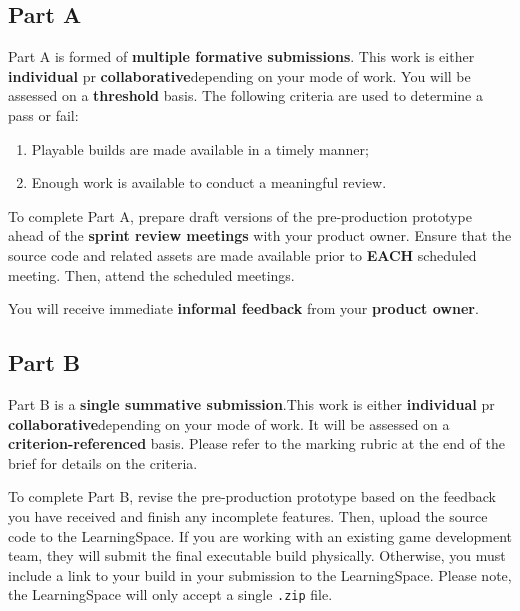 \documentclass{../../fal_assignment}
\begin{document}

\subsection*{Part A}

Part A is formed of \textbf{multiple formative submissions}. This work is either \textbf{individual} pr \textbf{collaborative}depending on your mode of work. You will be assessed on a \textbf{threshold} basis. The following criteria are used to determine a pass or fail:

\begin{enumerate}[label=(\alph*)]
	\item Playable builds are made available in a timely manner;
	\item Enough work is available to conduct a meaningful review.
\end{enumerate}

To complete Part A, prepare draft versions of the pre-production prototype ahead of the \textbf{sprint review meetings} with your product owner. Ensure that the source code and related assets are made available prior to \textbf{EACH} scheduled meeting. Then, attend the scheduled meetings.

You will receive immediate \textbf{informal feedback} from your \textbf{product owner}.

\subsection*{Part B}

Part B is a \textbf{single summative submission}.This work is either \textbf{individual} pr \textbf{collaborative}depending on your mode of work. It will be assessed on a \textbf{criterion-referenced} basis. Please refer to the marking rubric at the end of the brief for details on the criteria.

To complete Part B, revise the pre-production prototype based on the feedback you have received and finish any incomplete features. Then, upload the source code to the LearningSpace. If you are working with an existing game development team, they will submit the final executable build physically. Otherwise, you must include a link to your build in your submission to the LearningSpace. Please note, the LearningSpace will only accept a single \texttt{.zip} file. 
\end{document}
